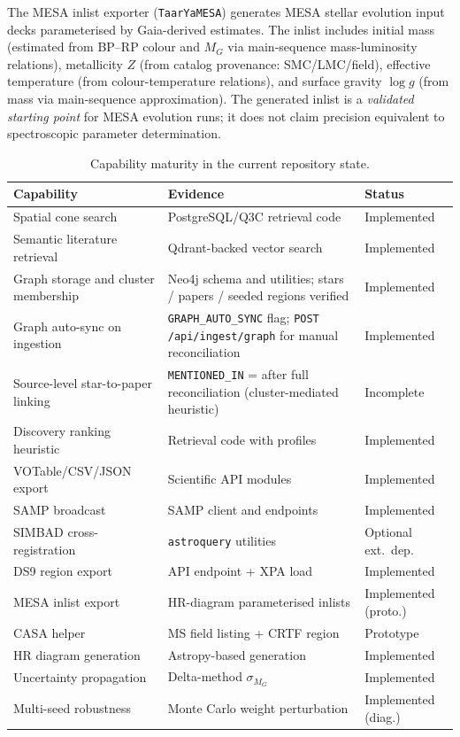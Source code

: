 \documentclass[preprint,12pt,authoryear]{elsarticle}
\begin{document}
The MESA inlist exporter (\texttt{TaarYaMESA}) generates MESA stellar evolution input decks \citep{Paxton2011} parameterised by Gaia-derived estimates. The inlist includes initial mass (estimated from BP--RP colour and $M_G$ via main-sequence mass-luminosity relations), metallicity $Z$ (from catalog provenance: SMC/LMC/field), effective temperature (from colour-temperature relations), and surface gravity $\log g$ (from mass via main-sequence approximation). The generated inlist is a \emph{validated starting point} for MESA evolution runs; it does not claim precision equivalent to spectroscopic parameter determination.

\begin{table}[htbp]
\centering
\caption{Capability maturity in the current repository state.}
\label{tab:maturity}
\small
\begin{tabularx}{\textwidth}{@{}p{3.2cm}Xl@{}}
\toprule
\textbf{Capability} & \textbf{Evidence} & \textbf{Status} \\
\midrule
Spatial cone search & PostgreSQL/Q3C retrieval code & Implemented \\
Semantic literature retrieval & Qdrant-backed vector search & Implemented \\
Graph storage and cluster membership & Neo4j schema and utilities; \nStarNodes{} stars / \nPaperNodes{} papers / \nClusterNodes{} seeded regions verified & Implemented \\
Graph auto-sync on ingestion & \texttt{GRAPH\allowbreak\_AUTO\allowbreak\_SYNC} flag; \texttt{POST /api/\allowbreak ingest/\allowbreak graph} for manual reconciliation & Implemented \\
Source-level star-to-paper linking & \texttt{MENTIONED\allowbreak\_IN} = \nMentionedInEdges{} after full reconciliation (cluster-mediated heuristic) & Incomplete \\
Discovery ranking heuristic & Retrieval code with profiles & Implemented \\
VOTable/CSV/JSON export & Scientific API modules & Implemented \\
SAMP broadcast & SAMP client and endpoints & Implemented \\
SIMBAD cross-registration & \texttt{astroquery} utilities & Optional ext.\ dep. \\
DS9 region export & API endpoint + XPA load & Implemented \\
MESA inlist export & HR-diagram parameterised inlists & Implemented (proto.) \\
CASA helper & MS field listing + CRTF region & Prototype \\
HR diagram generation & Astropy-based generation & Implemented \\
Uncertainty propagation & Delta-method $\sigma_{M_G}$ & Implemented \\
Multi-seed robustness & Monte Carlo weight perturbation & Implemented (diag.) \\
\bottomrule
\end{tabularx}
\end{table}
\end{document}
